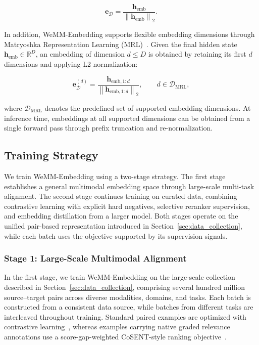 \documentclass[]{wechat}
\begin{document}
\begin{equation}
    \mathbf{e}_{\mathcal{D}}
    =
    \frac{
        \mathbf{h}_{\mathrm{emb}}
    }{
        \left\|
            \mathbf{h}_{\mathrm{emb}}
        \right\|_2
    }.
    \label{eq:embedding_representation}
\end{equation}


In addition, WeMM-Embedding supports flexible embedding dimensions through Matryoshka Representation Learning (MRL)~\citep{MRL2022}. Given the final hidden state $\mathbf{h}_{\mathrm{emb}}\in\mathbb{R}^{D}$, an embedding of dimension $d\leq D$ is obtained by retaining its first $d$ dimensions and applying L2 normalization:

\begin{equation}
    \mathbf{e}_{\mathcal{D}}^{(d)}
    =
    \frac{
        \mathbf{h}_{\mathrm{emb},1:d}
    }{
        \left\|
            \mathbf{h}_{\mathrm{emb},1:d}
        \right\|_2
    },
    \qquad
    d\in\mathcal{D}_{\mathrm{MRL}},
    \label{eq:mrl_representation}
\end{equation}

where $\mathcal{D}_{\mathrm{MRL}}$ denotes the predefined set of supported embedding dimensions. At inference time, embeddings at all supported dimensions can be obtained from a single forward pass through prefix truncation and re-normalization.




\subsection{Training Strategy}
\label{sec:training_strategy}

We train WeMM-Embedding using a two-stage strategy. The first stage establishes a general multimodal embedding space through large-scale multi-task alignment. The second stage continues training on curated data, combining contrastive learning with explicit hard negatives, selective reranker supervision, and embedding distillation from a larger model. Both stages operate on the unified pair-based representation introduced in Section~\ref{sec:data_collection}, while each batch uses the objective supported by its supervision signals.

\subsubsection{Stage 1: Large-Scale Multimodal Alignment}
\label{sec:stage1_training}

In the first stage, we train WeMM-Embedding on the large-scale collection described in Section~\ref{sec:data_collection}, comprising several hundred million source--target pairs across diverse modalities, domains, and tasks. Each batch is constructed from a consistent data source, while batches from different tasks are interleaved throughout training. Standard paired examples are optimized with contrastive learning~\cite{infonce}, whereas examples carrying native graded relevance annotations use a score-gap-weighted CoSENT-style ranking objective~\cite{cosent}.
\end{document}
